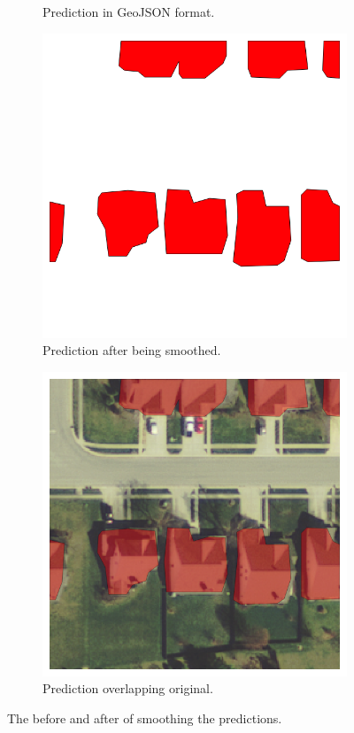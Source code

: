 \documentclass[acmtog, authorversion]{acmart}
\begin{document}
\begin{figure}
\begin{subfigure}[h]{0.24\textwidth}
    \caption{Prediction in GeoJSON format.}
    \label{fig:2}
  \end{subfigure}
  \begin{subfigure}[h]{0.24\textwidth}
    \includegraphics[width=\textwidth]{Images/0005_0028_smooth.png}
    \caption{Prediction after being smoothed.}
    \label{fig:3}
  \end{subfigure}
  \begin{subfigure}[h]{0.24\textwidth}
    \includegraphics[width=\textwidth]{Images/0005_0028_overlap.png}
    \caption{Prediction overlapping original.}
    \label{fig:4}
  \end{subfigure}
  \caption{The before and after of smoothing the predictions.}
  \label{fig:multi}
\end{figure}
\end{document}
